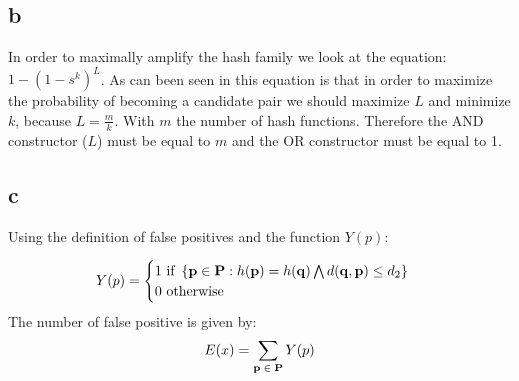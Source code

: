\documentclass[a4paper,12pt]{article}
\begin{document}
\subsection{b}
In order to maximally amplify the hash family we look at the equation: $1-(1-s^k)^L$. As can been seen in this equation is that in order to maximize the probability of becoming a candidate pair we should maximize $L$ and minimize $k$, because $L=\frac{m}{k}$. With $m$ the number of hash functions. Therefore the AND constructor ($L$) must be equal to $m$ and the OR constructor must be equal to 1. 

\subsection{c}
Using the definition of false positives and the function $Y(p)$:

\begin{equation}
\begin{aligned}
Y(p)= \begin{cases}
\text{1 if } \left\{ {\bf p} \in {\bf P}: h({\bf p})=h({\bf q}) \bigwedge d({\bf q}, {\bf p}) \leq d_2 \right\}\\
\text{0 otherwise} \end{cases}
\end{aligned}
\end{equation}
The number of false positive is given by:
\begin{equation}
\begin{aligned}
E(x)=\sum_{{\bf p}\; \in \;  {\bf P}}Y(p)
\end{aligned}
\end{equation}
\end{document}
